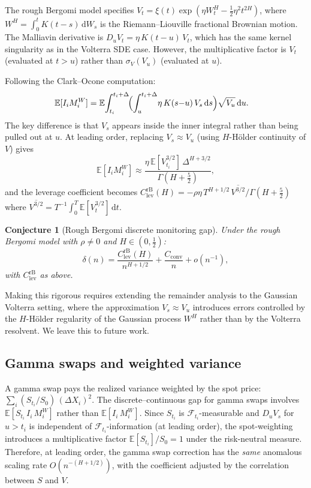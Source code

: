 \documentclass[12pt]{article}
\newtheorem{conjecture}[theorem]{Conjecture}
\theoremstyle{definition}
\newcommand{\E}{\mathbb{E}}
\newcommand{\dd}{\mathrm{d}}
\begin{document}
The rough Bergomi model \citep{BayerFrizGatheral2016} specifies
$V_t = \xi(t)\exp(\eta W^H_t - \tfrac12\eta^2 t^{2H})$,
where $W^H = \int_0^t K(t{-}s)\,\dd W_s$ is the Riemann--Liouville
fractional Brownian motion.
The Malliavin derivative is
$D_u V_t = \eta\,K(t{-}u)\,V_t$,
which has the same kernel singularity as in the Volterra SDE case.
However, the multiplicative factor is $V_t$ (evaluated at $t > u$)
rather than $\sigma_V(V_u)$ (evaluated at $u$).

Following the Clark--Ocone computation:
\begin{align*}
  \E[I_i M_i^W]
  &= \E\!\int_{t_i}^{t_i+\Delta}\!
  \Bigl(\int_u^{t_i+\Delta}\! \eta\,K(s{-}u)\,V_s\,\dd s\Bigr)
  \sqrt{V_u}\,\dd u.
\end{align*}
The key difference is that $V_s$ appears inside the inner integral
rather than being pulled out at $u$.
At leading order, replacing $V_s \approx V_u$ (using $H$-H\"older
continuity of $V$) gives
\[
  \E[I_i M_i^W]
  \approx \frac{\eta\,\E[V_{t_i}^{3/2}]\,\Delta^{H+3/2}}
  {\Gamma(H+\tfrac52)},
\]
and the leverage coefficient becomes
$C_{\mathrm{lev}}^{\mathrm{rB}}(H)
= -\rho\eta\,T^{H+1/2}\,
\overline{V^{3/2}}/\Gamma(H+\tfrac52)$
where $\overline{V^{3/2}}
= T^{-1}\!\int_0^T\!\E[V_t^{3/2}]\,\dd t$.

\begin{conjecture}[Rough Bergomi discrete monitoring gap]
\label{conj:rough-bergomi}
Under the rough Bergomi model with $\rho \neq 0$ and $H \in (0,\tfrac12)$:
\[
  \delta(n) = \frac{C_{\mathrm{lev}}^{\mathrm{rB}}(H)}{n^{H+1/2}}
  + \frac{C_{\mathrm{conv}}}{n} + o(n^{-1}),
\]
with $C_{\mathrm{lev}}^{\mathrm{rB}}$ as above.
\end{conjecture}

Making this rigorous requires extending the remainder analysis
to the Gaussian Volterra setting, where the approximation
$V_s \approx V_u$ introduces errors controlled by the $H$-H\"older
regularity of the Gaussian process $W^H$ rather than by the Volterra
resolvent. We leave this to future work.

\subsection{Gamma swaps and weighted variance}

A gamma swap pays the realized variance weighted by the spot
price: $\sum_i (S_{t_i}/S_0)\,(\Delta X_i)^2$.
The discrete--continuous gap for gamma swaps involves
$\E[S_{t_i}\,I_i\,M_i^W]$ rather than $\E[I_i\,M_i^W]$.
Since $S_{t_i}$ is $\mathcal{F}_{t_i}$-measurable and $D_u V_s$
for $u > t_i$ is independent of $\mathcal{F}_{t_i}$-information
(at leading order), the spot-weighting introduces a multiplicative
factor $\E[S_{t_i}]/S_0 = 1$ under the risk-neutral measure.
Therefore, at leading order, the gamma swap correction has the
\emph{same} anomalous scaling rate $O(n^{-(H+1/2)})$, with the
coefficient adjusted by the correlation between $S$ and $V$.
\end{document}
